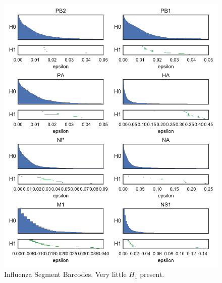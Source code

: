 \begin{figure}
\centering
\includegraphics[]{fig/influenza/flu_segment_barcodes.pdf}
\caption[Influenza Segment Barcodes]{Influenza Segment Barcodes. Very little $H_1$ present.}
\label{fig:flu:segment_barcodes}
\end{figure}

